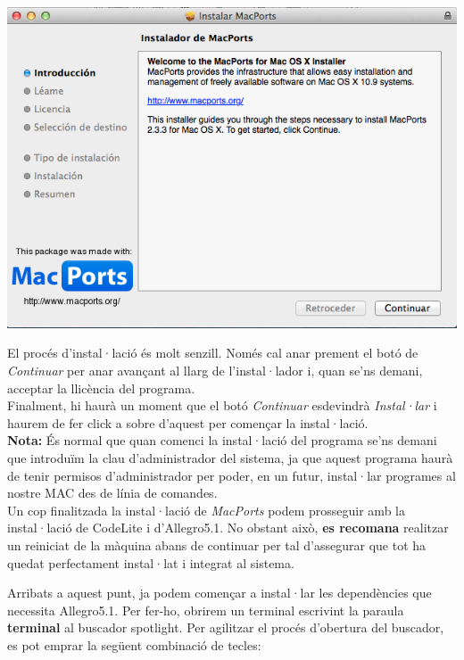 \documentclass[11pt]{article}
\begin{document}
\begin{center}
	\includegraphics[scale=0.5]{img/MacPorts_Installation.png}
\end{center}

\noindent El procés d'instal·lació és molt senzill. Només cal anar prement el botó de \textit{Continuar} per anar avançant al llarg de l'instal·lador i, quan se'ns demani, acceptar la llicència del programa.\\

\noindent Finalment, hi haurà un moment que el botó \textit{Continuar} esdevindrà \textit{Instal·lar} i haurem de fer click a sobre d'aquest per començar la instal·lació.\\

\noindent \textbf{Nota:} És normal que quan comenci la instal·lació del programa se'ns demani que introduïm la clau d'administrador del sistema, ja que aquest programa haurà de tenir permisos d'administrador per poder, en un futur, instal·lar programes al nostre MAC des de línia de comandes.\\

\noindent Un cop finalitzada la instal·lació de \textit{MacPorts} podem prosseguir amb la instal·lació de CodeLite i d'Allegro5.1. No obstant això, \textbf{es recomana }realitzar un reiniciat de la màquina abans de continuar per tal d'assegurar que tot ha quedat perfectament instal·lat i integrat al sistema.


\newpage

\noindent Arribats a aquest punt, ja podem començar a instal·lar les dependències que necessita Allegro5.1. Per fer-ho, obrirem un terminal escrivint la paraula \textbf{terminal} al buscador spotlight. Per agilitzar el procés d'obertura del buscador, es pot emprar la següent combinació de tecles:
\end{document}
